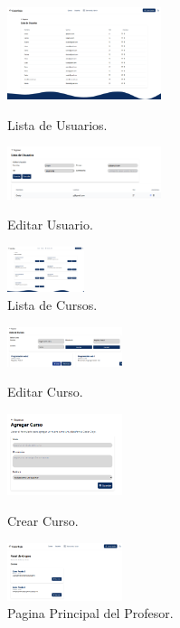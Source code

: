 \documentclass{article}
\begin{document}
\begin{figure}[H]
	\centering
	\includegraphics[width=0.4\textwidth,keepaspectratio]{img/adminListUser.png}
	\caption{Lista de Usuarios.}
	\centering
	\includegraphics[width=0.4\textwidth,keepaspectratio]{img/adminEditUser.png}
	\caption{Editar Usuario.}
	\centering
	\includegraphics[width=0.2\textwidth,keepaspectratio]{img/adminListCourse.png}
	\caption{Lista de Cursos.}
	\centering
\end{figure}

\begin{figure}[H]
	\centering
	\includegraphics[width=0.3\textwidth,keepaspectratio]{img/adminEditCourse.png}
	\caption{Editar Curso.}
	\centering
	\includegraphics[width=0.3\textwidth,keepaspectratio]{img/adminCreateCourse.png}
	\caption{Crear Curso.}
	\centering
	\includegraphics[width=0.3\textwidth,keepaspectratio]{img/teacherMain.png}
	\caption{Pagina Principal del Profesor.}
\end{figure}
\end{document}
